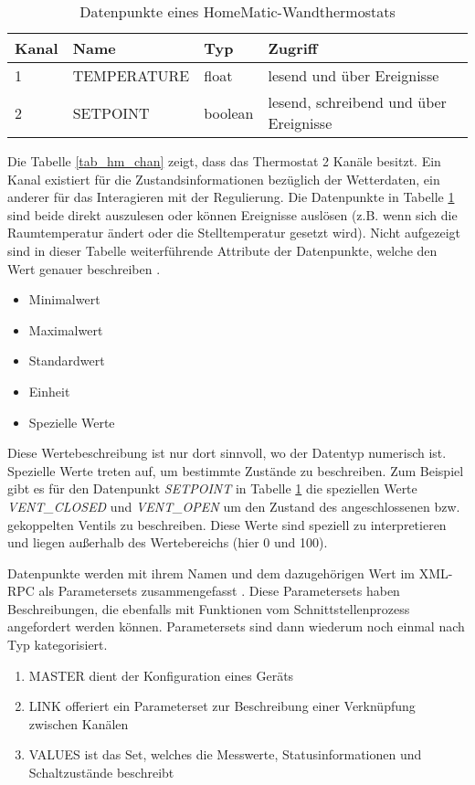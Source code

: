 \begin{table}[h]
\begin{tabular}{|l|l|l|l|}
\hline
Kanal & Name & Typ & Zugriff \\
\hline
1 & TEMPERATURE & float & lesend und über Ereignisse \\
\hline
2 & SETPOINT & boolean & lesend, schreibend und über Ereignisse \\
\hline
\end{tabular}
\caption{Datenpunkte eines HomeMatic-Wandthermostats}
\label{tab_hm_dp}
\end{table}

Die Tabelle \ref{tab_hm_chan} zeigt, dass das Thermostat 2 Kanäle besitzt.
Ein Kanal existiert für die Zustandsinformationen bezüglich der Wetterdaten, ein anderer
für das Interagieren mit der Regulierung.
Die Datenpunkte in Tabelle \ref{tab_hm_dp} sind beide direkt auszulesen oder können
Ereignisse auslösen (z.B. wenn sich die Raumtemperatur ändert oder die Stelltemperatur
gesetzt wird).
Nicht aufgezeigt sind in dieser Tabelle weiterführende Attribute der Datenpunkte, welche
den Wert genauer beschreiben \cite[Seite 3]{hmscript4}.

\begin{itemize}
\item Minimalwert
\item Maximalwert
\item Standardwert
\item Einheit
\item Spezielle Werte
\end{itemize}

Diese Wertebeschreibung ist nur dort sinnvoll, wo der Datentyp numerisch ist.
Spezielle Werte treten auf, um bestimmte Zustände zu beschreiben.
Zum Beispiel gibt es für den Datenpunkt \emph{SETPOINT} in Tabelle \ref{tab_hm_dp}
die speziellen Werte \emph{VENT\_CLOSED} und \emph{VENT\_OPEN} um den Zustand des angeschlossenen
bzw. gekoppelten Ventils zu beschreiben.
Diese Werte sind speziell zu interpretieren und liegen außerhalb des Wertebereichs
(hier 0 und 100).

Datenpunkte werden mit ihrem Namen und dem dazugehörigen Wert im XML-RPC als Parametersets
zusammengefasst .
Diese Parametersets haben Beschreibungen, die ebenfalls mit Funktionen vom Schnittstellenprozess
angefordert werden können.
Parametersets sind dann wiederum noch einmal nach Typ kategorisiert.
\begin{enumerate}
\item MASTER dient der Konfiguration eines Geräts
\item LINK offeriert ein Parameterset zur Beschreibung einer Verknüpfung zwischen Kanälen
\item VALUES ist das Set, welches die Messwerte, Statusinformationen und Schaltzustände beschreibt
\end{enumerate}

